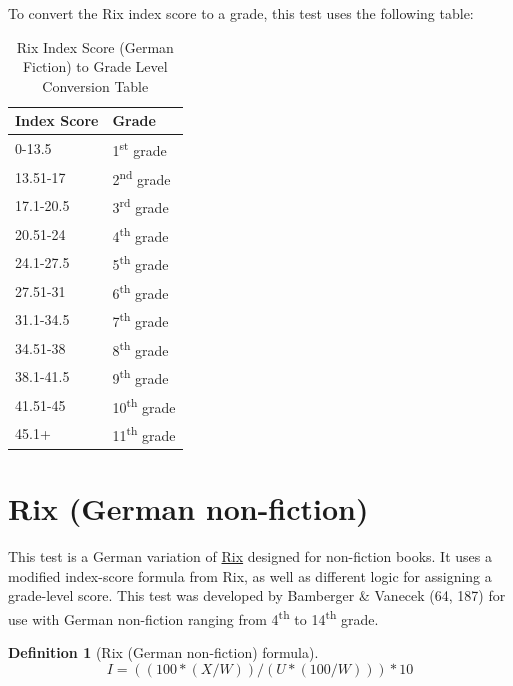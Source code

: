 \documentclass[
]{book}
\theoremstyle{definition}
\newtheorem{definition}{Definition}[chapter]
\theoremstyle{definition}
\theoremstyle{definition}
\theoremstyle{definition}
\theoremstyle{remark}
\begin{document}
\begin{minipage}{\textwidth}

To convert the Rix index score to a grade, this test uses the following table:

\begin{table}

\caption{\label{tab:unnamed-chunk-27}Rix Index Score (German Fiction) to Grade Level Conversion Table}
\centering
\begin{tabular}[t]{ll}
\toprule
Index Score & Grade\\
\midrule
0-13.5 & 1\textsuperscript{st} grade\\
13.51-17 & 2\textsuperscript{nd} grade\\
17.1-20.5 & 3\textsuperscript{rd} grade\\
20.51-24 & 4\textsuperscript{th} grade\\
24.1-27.5 & 5\textsuperscript{th} grade\\
27.51-31 & 6\textsuperscript{th} grade\\
31.1-34.5 & 7\textsuperscript{th} grade\\
34.51-38 & 8\textsuperscript{th} grade\\
38.1-41.5 & 9\textsuperscript{th} grade\\
41.51-45 & 10\textsuperscript{th} grade\\
45.1+ & 11\textsuperscript{th} grade\\
\bottomrule
\end{tabular}
\end{table}

\end{minipage}

\newpage

\hypertarget{rix-german-nonfiction}{%
\section{\texorpdfstring{Rix (German non-fiction)}{Rix (German non-fiction)}}\label{rix-german-nonfiction}}

This test is a German variation of \protect\hyperlink{rix-test}{Rix} designed for non-fiction books. It uses a modified index-score formula from Rix, as well as different logic for assigning a grade-level score. This test was developed by Bamberger \& Vanecek (64, 187) for use with German non-fiction ranging from 4\textsuperscript{th} to 14\textsuperscript{th} grade.

\begin{definition}[Rix (German non-fiction) formula]
\protect\hypertarget{def:rixnonfictionde}{}{\label{def:rixnonfictionde} {} }\[
I = ((100*(X/W))/(U*(100/W))) * 10
\]
\end{definition}
\end{document}
